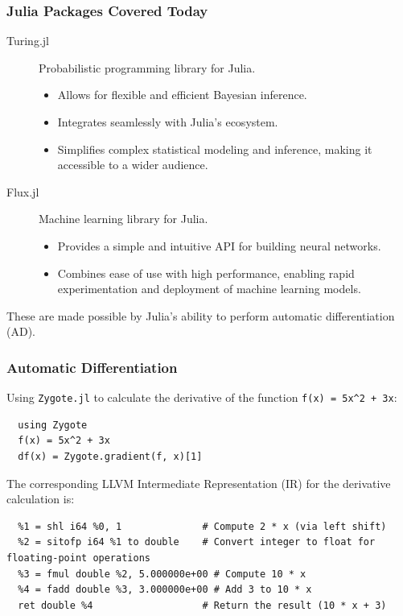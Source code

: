 \documentclass[aspectratio=169]{beamer} %
\begin{document}
\begin{frame}
  \frametitle{Julia Packages Covered Today}

  \begin{description}
    \item[Turing.jl] Probabilistic programming library for Julia.
      \begin{itemize}
        \item Allows for flexible and efficient Bayesian inference.
        \item Integrates seamlessly with Julia's ecosystem.
        \item Simplifies complex statistical modeling and inference, making it accessible to a wider audience.
      \end{itemize}
    \item[Flux.jl] Machine learning library for Julia.
      \begin{itemize}
        \item Provides a simple and intuitive API for building neural networks.
        \item Combines ease of use with high performance, enabling rapid experimentation and deployment of machine learning models.
      \end{itemize}
  \end{description}
  These are made possible by Julia's ability to perform automatic differentiation (AD).
\end{frame}

\begin{frame}[fragile]
  \frametitle{Automatic Differentiation}

  Using \verb|Zygote.jl| to calculate the derivative of the function \verb|f(x) = 5x^2 + 3x|:

  \scriptsize
  \begin{verbatim}
  using Zygote
  f(x) = 5x^2 + 3x
  df(x) = Zygote.gradient(f, x)[1]
  \end{verbatim}
  \normalsize

  The corresponding LLVM Intermediate Representation (IR) for the derivative calculation is:

  \scriptsize
  \begin{verbatim}
  %1 = shl i64 %0, 1              # Compute 2 * x (via left shift)
  %2 = sitofp i64 %1 to double    # Convert integer to float for floating-point operations
  %3 = fmul double %2, 5.000000e+00 # Compute 10 * x
  %4 = fadd double %3, 3.000000e+00 # Add 3 to 10 * x
  ret double %4                   # Return the result (10 * x + 3)
  \end{verbatim}
  \normalsize

\end{frame}
\end{document}
